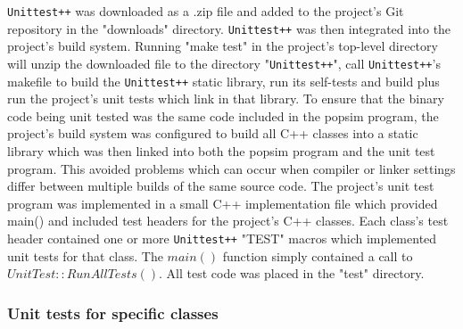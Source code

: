 \texttt{Unittest++} was downloaded as a .zip file and added to the project's Git repository in the "downloads" directory.
\texttt{Unittest++} was then integrated into the project's build system. Running "make test" in the project's top-level directory will unzip the downloaded file to the directory "\texttt{Unittest++}", call \texttt{Unittest++}'s makefile to build the \texttt{Unittest++} static library, run its self-tests and build plus run the project's unit tests which link in that library.
To ensure that the binary code being unit tested was the same code included in the popsim program, the project's build system was configured to build all C++ classes into a static library which was then linked into both the popsim program and the unit test program. This avoided problems which can occur when compiler or linker settings differ between multiple builds of the same source code.
The project's unit test program was implemented in a small C++ implementation file which provided main() and included test headers for the project's C++ classes.  Each class's test header contained one or more \texttt{Unittest++} "TEST" macros which implemented unit tests for that class.  The $main()$ function simply contained a call to $UnitTest::RunAllTests()$. All test code was placed in the "test" directory.

\subsubsection{Unit tests for specific classes}



%

